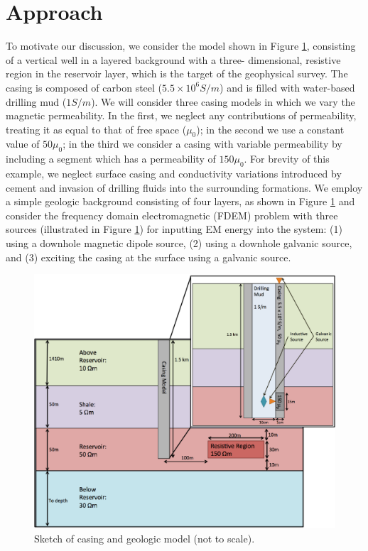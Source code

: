 \documentclass{segabs}
\begin{document}
\section{Approach}
To motivate our discussion, we consider the model shown in Figure \ref{fig:CasingGeoModel}, consisting of a vertical well in a layered background with a three- dimensional, resistive region in the reservoir layer, which is the target of the geophysical survey. The casing is composed of carbon steel ($5.5 \times 10^6 S/m$) and is filled with water-based drilling mud ($1 S/m$). We will consider three casing models in which we vary the magnetic permeability. In the first, we neglect any contributions of permeability, treating it as equal to that of free space ($\mu_0$); in the second we use a constant value of $50\mu_0$; in the third we consider a casing with variable permeability by including a segment which has a permeability of $150\mu_0$. For brevity of this example, we neglect surface casing and conductivity variations introduced by cement and invasion of drilling fluids into the surrounding formations. We employ a simple geologic background consisting of four layers, as shown in Figure \ref{fig:CasingGeoModel} and consider the frequency domain electromagnetic (FDEM) problem with three sources (illustrated in Figure \ref{fig:CasingGeoModel}) for inputting EM energy into the system: (1) using a downhole magnetic dipole source, (2) using a downhole galvanic source, and (3) exciting the casing at the surface using a galvanic source.
\begin{figure}[h!]
	\centering
	\includegraphics[width=0.9\columnwidth]{./Figures/CasingGeoModel}
	\caption{Sketch of casing and geologic model (not to scale).}
	\label{fig:CasingGeoModel}
\end{figure}
\end{document}
